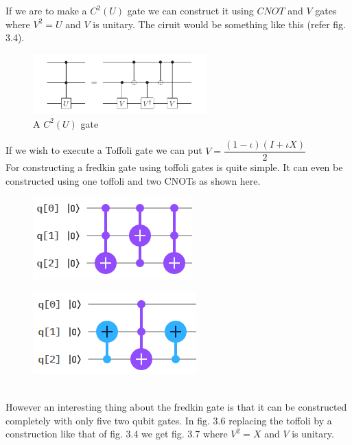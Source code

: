 \documentclass{report}
\begin{document}
If we are to make a $C^2(U)$ gate we can construct it using $CNOT$ and $V$ gates where $V^2 = U$ and $V$ is unitary. The ciruit would be something like this (refer fig. 3.4).
\begin{figure}[ht]
    \centering
    \includegraphics[width = 0.6\textwidth]{images/unitary 2 control.png}
    \caption{A $C^2(U)$ gate}
\end{figure}
If we wish to execute a Toffoli gate we can put $V = \dfrac{(1 - \iota)(I + \iota{X})}{2}$\\
For constructing a fredkin gate using toffoli gates is quite simple. It can even be constructed using one toffoli and two CNOTs as shown here.\\
\begin{figure}[ht]
\centering
\begin{minipage}{.5\textwidth}
\centering
\includegraphics[width=.5\linewidth]{images/fredkin with toffoli.png}
\label{fig:test1}
\end{minipage}%
\begin{minipage}{.5\textwidth}
\centering
\includegraphics[width=.5\linewidth]{images/fredkin with cnot.png}
\label{fig:test2}
\end{minipage}
\end{figure}\\
However an interesting thing about the fredkin gate is that it can be constructed completely with only five two qubit gates. In fig. 3.6 replacing the toffoli by a construction like that of fig. 3.4 we get fig. 3.7 where $V^2 = X$ and $V$ is unitary.\\
\end{document}
